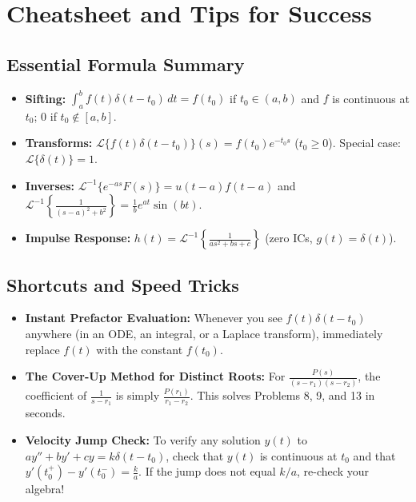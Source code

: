 \documentclass[11pt, letterpaper]{article}
\theoremstyle{definition}
\theoremstyle{remark}
\begin{document}
\newpage

\section{Cheatsheet and Tips for Success}

\subsection{Essential Formula Summary}
\begin{itemize}
    \item \textbf{Sifting:} $\int_a^b f(t)\delta(t - t_0)\,dt = f(t_0)$ if $t_0 \in (a, b)$ and $f$ is continuous at $t_0$; $0$ if $t_0 \notin [a, b]$.
    \item \textbf{Transforms:} $\mathcal{L}\{f(t)\delta(t - t_0)\}(s) = f(t_0)e^{-t_0 s}$ ($t_0 \ge 0$). Special case: $\mathcal{L}\{\delta(t)\} = 1$.
    \item \textbf{Inverses:} $\mathcal{L}^{-1}\{e^{-as}F(s)\} = u(t - a)f(t - a)$ and $\mathcal{L}^{-1}\left\{\frac{1}{(s-a)^2 + b^2}\right\} = \frac{1}{b}e^{at}\sin(bt)$.
    \item \textbf{Impulse Response:} $h(t) = \mathcal{L}^{-1}\left\{\frac{1}{as^2 + bs + c}\right\}$ (zero ICs, $g(t) = \delta(t)$).
\end{itemize}

\subsection{Shortcuts and Speed Tricks}
\begin{itemize}
    \item \textbf{Instant Prefactor Evaluation:} Whenever you see $f(t)\delta(t - t_0)$ anywhere (in an ODE, an integral, or a Laplace transform), immediately replace $f(t)$ with the constant $f(t_0)$.
    \item \textbf{The Cover-Up Method for Distinct Roots:} For $\frac{P(s)}{(s - r_1)(s - r_2)}$, the coefficient of $\frac{1}{s - r_1}$ is simply $\frac{P(r_1)}{r_1 - r_2}$. This solves Problems 8, 9, and 13 in seconds.
    \item \textbf{Velocity Jump Check:} To verify any solution $y(t)$ to $a y'' + b y' + c y = k\delta(t - t_0)$, check that $y(t)$ is continuous at $t_0$ and that $y'(t_0^+) - y'(t_0^-) = \frac{k}{a}$. If the jump does not equal $k/a$, re-check your algebra!
\end{itemize}
\end{document}
